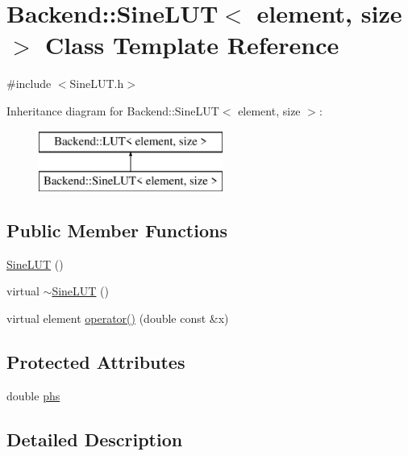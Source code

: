 \hypertarget{class_backend_1_1_sine_l_u_t}{\section{Backend\+:\+:Sine\+L\+U\+T$<$ element, size $>$ Class Template Reference}
\label{class_backend_1_1_sine_l_u_t}
}


{\ttfamily \#include $<$Sine\+L\+U\+T.\+h$>$}

Inheritance diagram for Backend\+:\+:Sine\+L\+U\+T$<$ element, size $>$\+:\begin{figure}[H]
\begin{center}
\leavevmode
\includegraphics[height=2.000000cm]{class_backend_1_1_sine_l_u_t}
\end{center}
\end{figure}
\subsection*{Public Member Functions}
\begin{DoxyCompactItemize}
\item 
\hyperlink{class_backend_1_1_sine_l_u_t_ab2784ed19d66ee885ffe23f3ef9d2214}{Sine\+L\+U\+T} ()
\item 
virtual \hyperlink{class_backend_1_1_sine_l_u_t_aeb5493bee1755391cea3690c31b1665b}{$\sim$\+Sine\+L\+U\+T} ()
\item 
virtual element \hyperlink{class_backend_1_1_sine_l_u_t_a461395dab282ae8ac9b517caf2d6a553}{operator()} (double const \&x)
\end{DoxyCompactItemize}
\subsection*{Protected Attributes}
\begin{DoxyCompactItemize}
\item 
double \hyperlink{class_backend_1_1_sine_l_u_t_af5d1e8bc8bda7d41272c17e0f2e9aad8}{phs}
\end{DoxyCompactItemize}


\subsection{Detailed Description}
